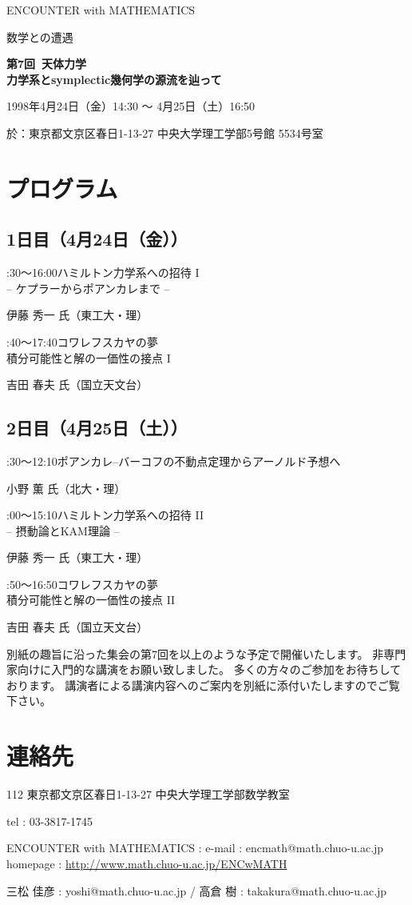 \documentclass[uplatex,dvipdfmx]{jlreq}
\newcommand{\talk}[3]{%
\noindent
#1\quad #2\par
\hspace*{2em}#3\par\smallskip
}
\newcommand{\EwMnumber}{第7回}
\newcommand{\EwMtitle}{天体力学\\[2mm]\large 力学系とsymplectic幾何学の源流を辿って}
\newcommand{\EwMdate}{1998年4月24日（金）14:30 ～ 4月25日（土）16:50}
\newcommand{\EwMplace}{東京都文京区春日1-13-27 中央大学理工学部5号館 5534号室}
\newcommand{\EwMtitleblock}{

\vspace*{-5mm}

\begin{center}

{\Large ENCOUNTER with MATHEMATICS}

\vspace{2mm}

{\large 数学との遭遇}

\vspace{4mm}

{\Large \bfseries \EwMnumber\ \EwMtitle}

\vspace{4mm}

\EwMdate

\vspace{2mm}

於：\EwMplace

\end{center}

\vspace{3mm}


\vspace{2mm}

}
\begin{document}
\EwMtitleblock


\section*{プログラム}

\subsection*{1日目（4月24日（金））}

\talk
{14:30～16:00}
{ハミルトン力学系への招待 I\\[1mm]-- ケプラーからポアンカレまで --}
{伊藤 秀一 氏（東工大・理）}

\talk
{16:40～17:40}
{コワレフスカヤの夢\\[1mm]積分可能性と解の一価性の接点 I}
{吉田 春夫 氏（国立天文台）}

\subsection*{2日目（4月25日（土））}

\talk
{10:30～12:10}
{ポアンカレ–バーコフの不動点定理からアーノルド予想へ}
{小野 薫 氏（北大・理）}

\talk
{14:00～15:10}
{ハミルトン力学系への招待 II\\[1mm]-- 摂動論とKAM理論 --}
{伊藤 秀一 氏（東工大・理）}

\talk
{15:50～16:50}
{コワレフスカヤの夢\\[1mm]積分可能性と解の一価性の接点 II}
{吉田 春夫 氏（国立天文台）}


\bigskip

別紙の趣旨に沿った集会の第7回を以上のような予定で開催いたします。  
非専門家向けに入門的な講演をお願い致しました。  
多くの方々のご参加をお待ちしております。  
講演者による講演内容へのご案内を別紙に添付いたしますのでご覧下さい。


\section*{連絡先}

112 東京都文京区春日1-13-27 中央大学理工学部数学教室

tel : 03-3817-1745  

ENCOUNTER with MATHEMATICS : e-mail : encmath@math.chuo-u.ac.jp  
homepage : \url{http://www.math.chuo-u.ac.jp/ENCwMATH}  

三松 佳彦 : yoshi@math.chuo-u.ac.jp / 高倉 樹 : takakura@math.chuo-u.ac.jp
\end{document}
